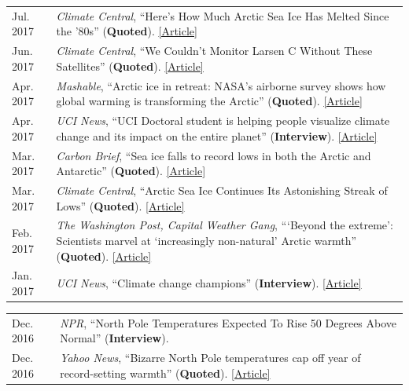 \documentclass[margin,line,palatino,courier,10pt]{res}
\begin{document}
\begin{resume}
\begin{tabular}{@{}p{0.9in}p{4in}}
Jul. 2017 & \textit{Climate Central}, ``Here's How Much Arctic Sea Ice Has Melted Since the '80s'' (\textbf{Quoted}). \href{http://www.climatecentral.org/news/arctic-sea-ice-melt-since-the-80s-21637}{[Article]}\\
Jun. 2017 & \textit{Climate Central}, ``We Couldn't Monitor Larsen C Without These Satellites'' (\textbf{Quoted}). \href{http://www.climatecentral.org/news/larsen-c-monitoring-satellites-21564}{[Article]}\\
Apr. 2017 & \textit{Mashable}, ``Arctic ice in retreat: NASA's airborne survey shows how global warming is transforming the Arctic'' (\textbf{Quoted}). \href{http://mashable.com/2017/04/13/arctic-meltdown-nasa-photos-changing-ice/?utm_cid=hp-n-1#BgdepWyM6Pq3}{[Article]}\\
Apr. 2017 & \textit{UCI News}, ``UCI Doctoral student is helping people visualize climate change and its impact on the entire planet'' (\textbf{Interview}). \href{http://grad.uci.edu/news-and-events/student-spotlights/Zachary-Labe.html}{[Article]}\\
Mar. 2017 & \textit{Carbon Brief}, ``Sea ice falls to record lows in both the Arctic and Antarctic'' (\textbf{Quoted}). \href{https://www.carbonbrief.org/sea-ice-falls-record-lows-arctic-antarctic}{[Article]}\\
Mar. 2017 & \textit{Climate Central}, ``Arctic Sea Ice Continues Its Astonishing Streak of Lows'' (\textbf{Quoted}). \href{http://www.climatecentral.org/news/arctic-sea-ice-record-low-streak-21227}{[Article]}\\
Feb. 2017 & \textit{The Washington Post, Capital Weather Gang}, ```Beyond the extreme': Scientists marvel at `increasingly non-natural' Arctic warmth'' (\textbf{Quoted}). \href{https://www.washingtonpost.com/news/capital-weather-gang/wp/2017/02/01/beyond-the-extreme-scientists-marvel-at-increasingly-non-natural-arctic-warmth/?sdfsdfsdfsdfsd&utm_term=.cf3cf81d24f3}{[Article]}\\
Jan. 2017 & \textit{UCI News}, ``Climate change champions'' (\textbf{Interview}). \href{https://news.uci.edu/climate-change-champions/}{[Article]}\\
\end{tabular}
\begin{tabular}{@{}p{0.9in}p{4in}}
Dec. 2016 & \textit{NPR}, ``North Pole Temperatures Expected To Rise 50 Degrees Above Normal'' (\textbf{Interview}). \\
Dec. 2016 & \textit{Yahoo News}, ``Bizarre North Pole temperatures cap off year of record-setting warmth'' (\textbf{Quoted}). \href{https://www.yahoo.com/news/bizarre-north-pole-temperatures-cap-off-year-of-record-setting-warmth-181727978.html?soc_src=social-sh&soc_trk=tw}{[Article]}\\

\end{tabular}
\end{resume}
\end{document}
